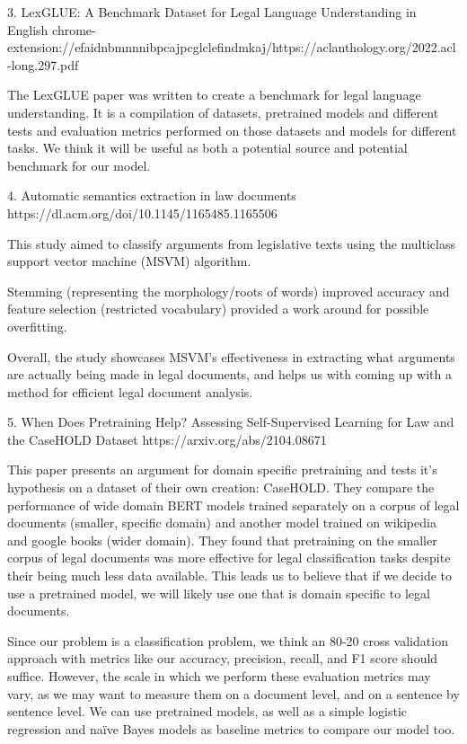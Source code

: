 \documentclass[11pt,a4paper]{article}
\begin{document}
3. LexGLUE: A Benchmark Dataset for Legal Language Understanding in English
chrome-extension://efaidnbmnnnibpcajpcglclefindmkaj/https://aclanthology.org/2022.acl-long.297.pdf

The LexGLUE paper was written to create a benchmark for legal language understanding. It is a compilation of datasets, pretrained models and different tests and evaluation metrics performed on those datasets and models for different tasks. We think it will be useful as both a potential source and potential benchmark for our model.

4. Automatic semantics extraction in law documents
https://dl.acm.org/doi/10.1145/1165485.1165506 

This study aimed to classify arguments from legislative texts using the multiclass support vector machine (MSVM) algorithm.

Stemming (representing the morphology/roots of words) improved accuracy and feature selection (restricted vocabulary) provided a work around for possible overfitting.

Overall, the study showcases MSVM's effectiveness in extracting what arguments are actually being made in legal documents,
and helps us with coming up with a method for efficient legal document analysis.

5. When Does Pretraining Help? Assessing Self-Supervised Learning for Law and the CaseHOLD Dataset
https://arxiv.org/abs/2104.08671

This paper presents an argument for domain specific pretraining and tests it's hypothesis on a dataset of their own creation: CaseHOLD. They compare the performance of wide domain BERT models trained separately on a corpus of legal documents (smaller, specific domain) and another model trained on wikipedia and google books (wider domain). They found that pretraining on the smaller corpus of legal documents was more effective for legal classification tasks despite their being much less data available. This leads us to believe that if we decide to use a pretrained model, we will likely use one that is domain specific to legal documents. 

Since our problem is a classification problem, we think an 80-20 cross validation approach with metrics like our accuracy, precision, recall, and F1 score should suffice. However, the scale in which we perform these evaluation metrics may vary, as we may want to measure them on a document level, and on a sentence by sentence level. We can use pretrained models, as well as a simple logistic regression and naïve Bayes models as baseline metrics to compare our model too. 
\end{document}

